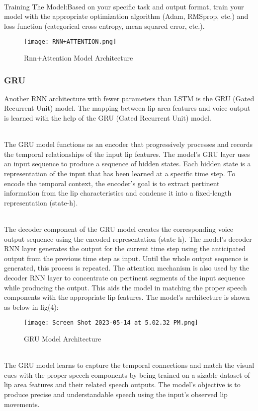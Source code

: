 \documentclass[conference]{IEEEtran}
\begin{document}
\\ Training The Model:Based on your specific task and output format, train your model with the appropriate optimization algorithm (Adam, RMSprop, etc.) and loss function (categorical cross entropy, mean squared error, etc.). 

\begin{figure}[htbp]
\centerline{\texttt{[image: RNN+ATTENTION.png]}}
\caption{Rnn+Attention Model Architecture}
\label{fig}
\end{figure}

\subsubsection{GRU}
Another RNN architecture with fewer parameters than LSTM is the GRU (Gated Recurrent Unit) model. The mapping between lip area features and voice output is learned with the help of the GRU (Gated Recurrent Unit) model.

\\ The GRU model functions as an encoder that progressively processes and records the temporal relationships of the input lip features. The model's GRU layer uses an input sequence to produce a sequence of hidden states. Each hidden state is a representation of the input that has been learned at a specific time step. To encode the temporal context, the encoder's goal is to extract pertinent information from the lip characteristics and condense it into a fixed-length representation (state-h).

\\ The decoder component of the GRU model creates the corresponding voice output sequence using the encoded representation (state-h). The model's decoder RNN layer generates the output for the current time step using the anticipated output from the previous time step as input. Until the whole output sequence is generated, this process is repeated. The attention mechanism is also used by the decoder RNN layer to concentrate on pertinent segments of the input sequence while producing the output. This aids the model in matching the proper speech components with the appropriate lip features. The model's architecture is shown as below in fig(4):
\begin{figure}[htbp]
\centerline{\texttt{[image: Screen Shot 2023-05-14 at 5.02.32 PM.png]}}
\caption{GRU Model Architecture}
\label{fig}
\end{figure}
\\ The GRU model learns to capture the temporal connections and match the visual cues with the proper speech components by being trained on a sizable dataset of lip area features and their related speech outputs. The model's objective is to produce precise and understandable speech using the input's observed lip movements.
\end{document}
